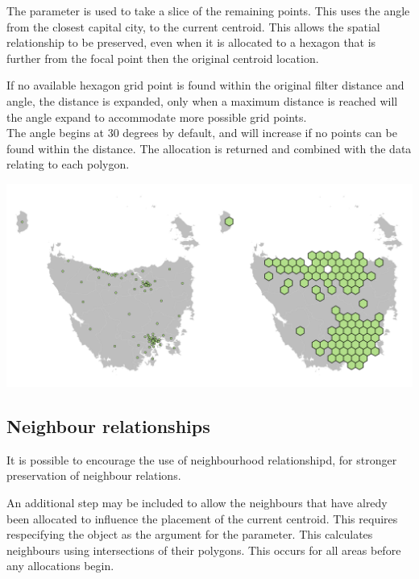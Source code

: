 \documentclass[
]{jss}
\begin{document}
The  parameter is used to take a slice of the remaining
points. This uses the angle from the closest capital city, to the
current centroid. This allows the spatial relationship to be preserved,
even when it is allocated to a hexagon that is further from the focal
point then the original centroid location.

If no available hexagon grid point is found within the original filter
distance and angle, the distance is expanded, only when a maximum
distance is reached will the angle expand to accommodate more possible
grid points.\\
The angle begins at 30 degrees by default, and will increase if no
points can be found within the  distance. The
allocation is returned and combined with the data relating to each
polygon.

\begin{CodeChunk}


\begin{center}\includegraphics[width=1\linewidth]{figures/6allocate} \end{center}

\end{CodeChunk}

\hypertarget{neighbour-relationships}{%
\subsection{Neighbour relationships}\label{neighbour-relationships}}

It is possible to encourage the use of neighbourhood relationshipd, for
stronger preservation of neighbour relations.

An additional step may be included to allow the neighbours that have
alredy been allocated to influence the placement of the current
centroid. This requires respecifying the  object as the
argument for the  parameter. This calculates
neighbours using intersections of their polygons. This occurs for all
areas before any allocations begin.
\end{document}
